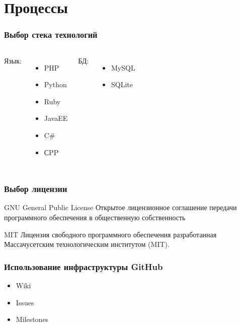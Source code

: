 \documentclass{beamer}
\begin{document}
\section{Процессы}

\begin{frame}
\frametitle{Выбор стека технологий}

\begin{columns}[t]
Язык:
\begin{itemize}
\item PHP
\item Python
\item Ruby
\item JavaEE
\item C\#
\item СPP
\end{itemize}

БД:
\begin{itemize}
\item MySQL
\item SQLite
\end{itemize}
\end{columns}

\end{frame}


\begin{frame}
\frametitle{Выбор лицензии}

\begin{block}{GNU General Public License}
Открытое лицензионное соглашение передачи программного обеспечения в общественную собственность
\end{block}

\begin{block}{MIT}
Лицензия свободного программного обеспечения разработанная Массачусетским технологическим институтом (MIT).
\end{block}

\end{frame}


\begin{frame}
\frametitle{Использование инфраструктуры GitHub}

\begin{itemize}
\item Wiki
\item Issues
\item Milestones
\end{itemize}

\end{frame}
\end{document}
